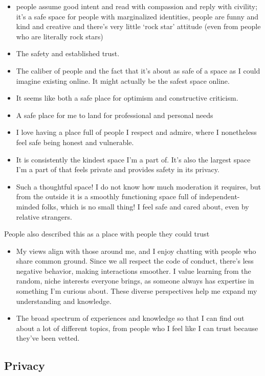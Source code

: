 \documentclass[
]{book}
\providecommand{\tightlist}{%
  \setlength{\itemsep}{0pt}\setlength{\parskip}{0pt}}
\begin{document}
\begin{itemize}
\tightlist
\item
  people assume good intent and read with compassion and reply with civility; it's a safe space for people with marginalized identities, people are funny and kind and creative and there's very little `rock star' attitude (even from people who are literally rock stars)
\item
  The safety and established trust.
\item
  The caliber of people and the fact that it's about as safe of a space as I could imagine existing online. It might actually be the safest space online.
\item
  It seems like both a safe place for optimism and constructive criticism.
\item
  A safe place for me to land for professional and personal needs
\item
  I love having a place full of people I respect and admire, where I nonetheless feel safe being honest and vulnerable.
\item
  It is consistently the kindest space I'm a part of. It's also the largest space I'm a part of that feels private and provides safety in its privacy.
\item
  Such a thoughtful space! I do not know how much moderation it requires, but from the outside it is a smoothly functioning space full of independent-minded folks, which is no small thing! I feel safe and cared about, even by relative strangers.
\end{itemize}

People also described this as a place with people they could trust

\begin{itemize}
\tightlist
\item
  My views align with those around me, and I enjoy chatting with people who share common ground. Since we all respect the code of conduct, there's less negative behavior, making interactions smoother. I value learning from the random, niche interests everyone brings, as someone always has expertise in something I'm curious about. These diverse perspectives help me expand my understanding and knowledge.
\item
  The broad spectrum of experiences and knowledge so that I can find out about a lot of different topics, from people who I feel like I can trust because they've been vetted.
\end{itemize}

\subsection{Privacy}\label{privacy}
\end{document}
